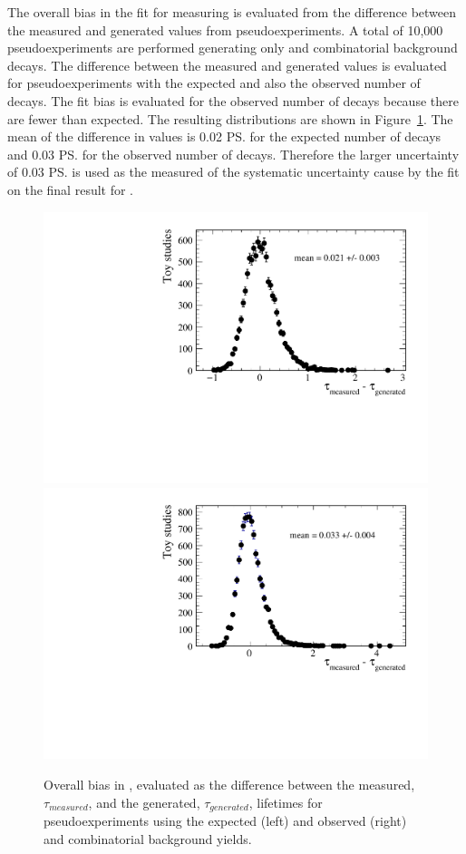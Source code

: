 The overall bias in the fit for measuring \tmumu is evaluated from the difference between the measured and generated values from pseudoexperiments. A total of 10,000 pseudoexperiments are performed generating only \bsmumu and combinatorial background decays. %
The difference between the measured and generated \tmumu values is evaluated for pseudoexperiments with the expected and also the observed number of \bsmumu decays. The fit bias is evaluated for the observed number of decays because there are fewer than expected. The resulting distributions are shown in Figure~\ref{fig:BsmumuYieldPulls}. The mean of the difference in \tmumu values is 0.02 \ps for the expected number of decays and 0.03 \ps for the observed number of decays. Therefore the larger uncertainty of 0.03 \ps is used as the measured of the systematic uncertainty cause by the fit on the final result for \tmumu. %

\begin{figure}[htbp]
    \centering
        \includegraphics[width=0.49 \textwidth]{./Figs/LifetimeSystematics/tau_meas-tau_gen_expected.pdf}
        \includegraphics[width=0.49 \textwidth]{./Figs/LifetimeSystematics/tau_meas_tau_gen_observed.pdf}
    \caption{Overall bias in \tmumu, evaluated as the difference between the measured, $\tau_{measured}$, and the generated, $\tau_{generated}$, lifetimes for pseudoexperiments using the expected (left) and observed (right) \bsmumu and combinatorial background yields.}
    \label{fig:BsmumuYieldPulls}
\end{figure}


